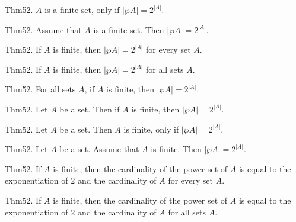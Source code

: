 \documentclass{article}
\begin{document}
Thm52. $A$ is a finite set, only if $| \wp A | = 2 ^ {| A |}$.

Thm52. Assume that $A$ is a finite set. Then $| \wp A | = 2 ^ {| A |}$.

Thm52. If $A$ is finite, then $| \wp A | = 2 ^ {| A |}$ for every set $A$.

Thm52. If $A$ is finite, then $| \wp A | = 2 ^ {| A |}$ for all sets $A$.

Thm52. For all sets $A$, if $A$ is finite, then $| \wp A | = 2 ^ {| A |}$.

Thm52. Let $A$ be a set. Then if $A$ is finite, then $| \wp A | = 2 ^ {| A |}$.

Thm52. Let $A$ be a set. Then $A$ is finite, only if $| \wp A | = 2 ^ {| A |}$.

Thm52. Let $A$ be a set. Assume that $A$ is finite. Then $| \wp A | = 2 ^ {| A |}$.

Thm52. If $A$ is finite, then the cardinality of the power set of $A$ is equal to the exponentiation of $2$ and the cardinality of $A$ for every set $A$.

Thm52. If $A$ is finite, then the cardinality of the power set of $A$ is equal to the exponentiation of $2$ and the cardinality of $A$ for all sets $A$.
\end{document}
